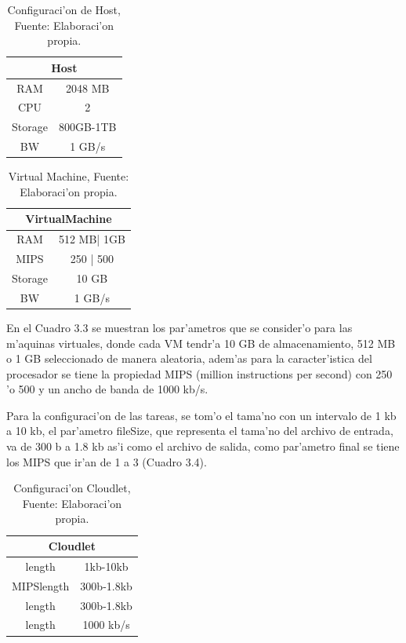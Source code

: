 \begin{table}[!hbt]
	\centering
	\caption{Configuraci'on de Host, Fuente: Elaboraci'on propia.}
	\label{my-label}
	\begin{tabular}{@{}cc@{}}
		\toprule
		\multicolumn{2}{c}{{\bf Host}} \\ \midrule
		RAM           & 2048 MB        \\
		CPU           & 2              \\
		Storage       & 800GB-1TB      \\ \midrule
		BW            & 1 GB/s        
	\end{tabular}
\end{table}

\begin{table}[!hbt]
	\centering
	\caption{Virtual Machine, Fuente: Elaboraci'on propia.}
	\label{my-label}
	\begin{tabular}{@{}cc@{}}
		\toprule
		\multicolumn{2}{c}{{\bf VirtualMachine}} \\ \midrule
		RAM               & 512 MB| 1GB          \\
		MIPS              & 250 | 500            \\
		Storage           & 10 GB                \\ \midrule
		BW                & 1 GB/s              
	\end{tabular}
\end{table}


En el Cuadro 3.3 se muestran los par'ametros que se consider'o para las m'aquinas virtuales, donde cada VM tendr'a 10 GB de almacenamiento, 512 MB  o 1 GB seleccionado de manera aleatoria, adem'as para la caracter'istica del procesador se tiene  la propiedad MIPS (million instructions per second) con 250 'o 500 y un ancho de banda de 1000 kb/s.

Para la configuraci'on de las tareas, se tom'o el tama'no con un intervalo de 1 kb a 10 kb,  el par'ametro fileSize, que representa el tama'no del archivo de entrada, va de 300 b a 1.8 kb as'i como el archivo de salida, como par'ametro final se tiene los MIPS que ir'an de 1 a 3 (Cuadro 3.4).



\begin{table}[!hbt]
	\centering
	\caption{Configuraci'on Cloudlet, Fuente: Elaboraci'on propia.}
	\label{my-label}
	\begin{tabular}{@{}cc@{}}
		\toprule
		\multicolumn{2}{c}{{\bf Cloudlet}} \\ \midrule
		length           & 1kb-10kb        \\
		MIPSlength       & 300b-1.8kb      \\
		length           & 300b-1.8kb      \\ \midrule
		length           & 1000 kb/s      
	\end{tabular}
\end{table}

